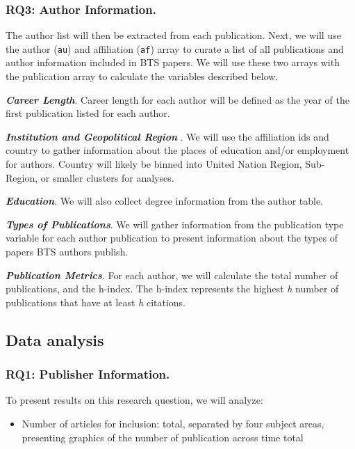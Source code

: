 \documentclass[
  man]{apa7}
\providecommand{\tightlist}{%
  \setlength{\itemsep}{0pt}\setlength{\parskip}{0pt}}
\begin{document}
\hypertarget{rq3-author-information.}{%
\subsubsection{RQ3: Author Information.}\label{rq3-author-information.}}

The author list will then be extracted from each publication. Next, we
will use the author (\texttt{au}) and affiliation (\texttt{af}) array to curate a list
of all publications and author information included in BTS papers. We
will use these two arrays with the publication array to calculate the
variables described below.

\textbf{\emph{Career Length}}. Career length for each author will be defined as
the year of the first publication listed for each author.

\textbf{\emph{Institution and Geopolitical Region}} . We will use the affiliation
ids and country to gather information about the places of education
and/or employment for authors. Country will likely be binned into United Nation Region, Sub-Region, or smaller clusters for analyses.

\textbf{\emph{Education}}. We will also collect degree information from the author table.

\textbf{\emph{Types of Publications}}. We will gather information from the
publication type variable for each author publication to present
information about the types of papers BTS authors publish.

\textbf{\emph{Publication Metrics}}. For each author, we will calculate the total
number of publications, and the h-index. The h-index represents the
highest \emph{h} number of publications that have at least \emph{h} citations.

\hypertarget{data-analysis}{%
\subsection{Data analysis}\label{data-analysis}}

\hypertarget{rq1-publisher-information.-1}{%
\subsubsection{RQ1: Publisher Information.}\label{rq1-publisher-information.-1}}

To present results on this research question, we will analyze:

\begin{itemize}
\tightlist
\item
  Number of articles for inclusion: total, separated by four subject
  areas, presenting graphics of the number of publication across time
  total
\end{itemize}
\end{document}
